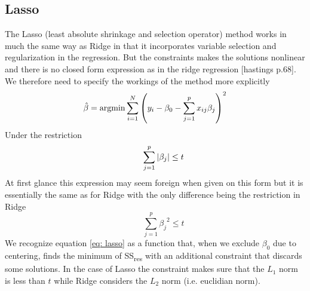 \subsection{Lasso}
The Lasso (least absolute shrinkage and selection operator) method works in much the same way as Ridge in that it incorporates variable selection and regularization in the regression. But the constraints makes the solutions nonlinear and there is no closed form expression as in the ridge regression [hastings p.68]. We therefore need to specify the workings of the method more explicitly
\begin{equation}\label{eq: lasso}
	\hat{\beta} = \mathrm{argmin}\sum_{i=1}^N\qty( y_i - \beta_0 - \sum_{j=1}^p x_{ij}\beta_j )^2
\end{equation}
Under the restriction
\begin{equation}\label{eq: lasso restriction}
	\qquad \sum_{j=1}^p\abs{\beta_j}\leq t
\end{equation}
At first glance this expression may seem foreign when given on this form but it is essentially the same as for Ridge with the only difference being the restriction in Ridge
\begin{equation}\label{eq: ridge restriction}
	\qquad \sum_{j=1}^p{\beta_j}^2\leq t
\end{equation}
We recognize equation \ref{eq: lasso} as a function that, when we exclude $\beta_0$ due to centering, finds the minimum of SS\textsubscript{res} with an additional constraint that discards some solutions. In the case of Lasso the constraint makes sure that the $L_1$ norm is less than $t$ while Ridge considers the $L_2$ norm (i.e. euclidian norm).

